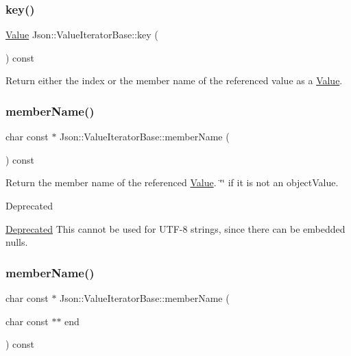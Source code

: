 \subsubsection{\texorpdfstring{key()}{key()}}
{\footnotesize\ttfamily \hyperlink{classJson_1_1Value}{Value} Json\+::\+Value\+Iterator\+Base\+::key (\begin{DoxyParamCaption}{ }\end{DoxyParamCaption}) const}

Return either the index or the member name of the referenced value as a \hyperlink{classJson_1_1Value}{Value}. \mbox{\label{classJson_1_1ValueIteratorBase_a54765da6759fd3f1edcbfbaf308ec263}} 
\subsubsection{\texorpdfstring{member\+Name()}{memberName()}\hspace{0.1cm}{\footnotesize\ttfamily [1/2]}}
{\footnotesize\ttfamily char const  $\ast$ Json\+::\+Value\+Iterator\+Base\+::member\+Name (\begin{DoxyParamCaption}{ }\end{DoxyParamCaption}) const}

Return the member name of the referenced \hyperlink{classJson_1_1Value}{Value}. \char`\"{}\char`\"{} if it is not an object\+Value. \begin{DoxyRefDesc}{Deprecated}
\item[\hyperlink{deprecated__deprecated000004}{Deprecated}]This cannot be used for U\+T\+F-\/8 strings, since there can be embedded nulls. \end{DoxyRefDesc}
\mbox{\label{classJson_1_1ValueIteratorBase_a391c9cbd0edf9a447b37df00e8ce6059}} 
\subsubsection{\texorpdfstring{member\+Name()}{memberName()}\hspace{0.1cm}{\footnotesize\ttfamily [2/2]}}
{\footnotesize\ttfamily char const  $\ast$ Json\+::\+Value\+Iterator\+Base\+::member\+Name (\begin{DoxyParamCaption}\item[{char const $\ast$$\ast$}]{end }\end{DoxyParamCaption}) const}

